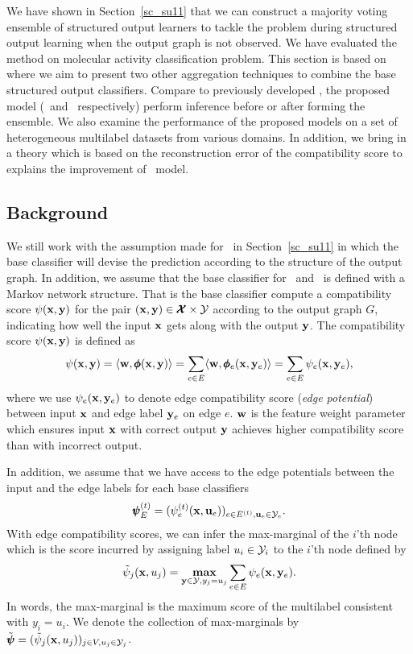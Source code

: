{We have shown in Section~\ref{sc_su11} that we can construct a majority voting ensemble of structured output learners to tackle the problem during structured output learning when the output graph is not observed.
We have evaluated the method on molecular activity classification problem.
This section is based on  where we aim to present two other aggregation techniques to combine the base structured output classifiers.
Compare to previously developed \mve, the proposed model (\amm\ and \mam\ respectively) perform inference before or after forming the ensemble.
We also examine the performance of the proposed models on a set of heterogeneous multilabel datasets from various domains.
In addition, we bring in a theory which is based on the reconstruction error of the compatibility score to explains the improvement of \mam\ model.



%
%
\subsection{Background}

We still work with the assumption made for \mve\ in Section~\ref{sc_su11} in which the base classifier will devise the prediction according to the structure of the output graph.
In addition, we assume that the base classifier for \amm\ and \mam\ is defined with a Markov network structure.
That is the base classifier compute a compatibility score $\psi(\mathbf {x},\mathbf {y})$ for the pair $(\mathbf {x},\mathbf {y})\in\pmb {\mathcal{X}}\times\mathcal{Y}$ according to the output graph $G$, indicating how well the input $\mathbf {x}$ gets along with the output $\mathbf {y}$.
The compatibility score $\psi(\mathbf {x},\mathbf {y})$ is defined as
\begin{align*}
	\psi(\mathbf {x},\mathbf {y}) = \langle \mathbf {w}, \pmb \phi(\mathbf {x},\mathbf {y}) \rangle = \sum_{e\in E}\langle \mathbf {w}, \pmb \phi_e(\mathbf {x},\mathbf {y}_e) \rangle=\sum_{e\in E}\psi_e(\mathbf {x},\mathbf {y}_e),
\end{align*}
where we use $\psi_e(\mathbf {x},\mathbf {y}_e)$ to denote edge compatibility score (\textit{edge potential}) between input $\mathbf {x}$ and edge label $\mathbf {y}_e$ on edge $e$.
$\mathbf {w}$ is the feature weight parameter which ensures input $\mathbf {x}$ with correct output $\mathbf {y}$ achieves higher compatibility score than with incorrect output.

In addition, we assume that we have access to the edge potentials between the input and the edge labels for each base classifiers
\begin{align*}
	\pmb \psi_E^{(t)} = (\psi_e^{(t)}(\mathbf {x},\mathbf {u}_e))_{e\in E^{(t)},\mathbf {u}_e\in\mathcal{Y}_e}.
\end{align*}
With edge compatibility scores, we can infer the max-marginal of the $i$'th node which is the score incurred by assigning label $u_i\in\mathcal{Y}_i$ to the $i$'th node \citep{Wainwright05map} defined by
\begin{align*}
	\tilde{\psi}_j(\mathbf {x},u_j) = \underset{\mathbf {y}\in\mathcal{Y},y_j=u_j}{\textbf{max}}\sum_{e\in E}\psi_e(\mathbf {x},\mathbf {y}_e).
\end{align*}
In words, the max-marginal is the maximum score of the multilabel consistent with $y_i=u_i$.
We denote the collection of max-marginals by $\tilde{\pmb \psi} = (\tilde{\psi}_j(\mathbf {x},u_j))_{j\in V,u_j\in\mathcal{Y}_j}$.

}
